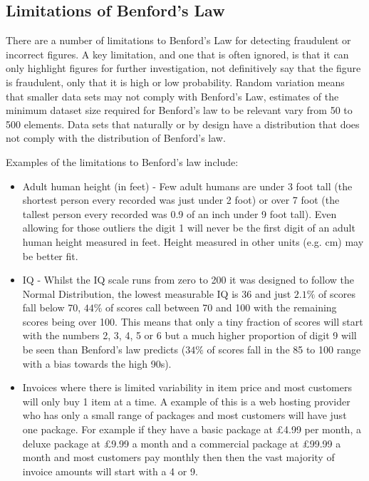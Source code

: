 \subsection{Limitations of Benford's Law}
There are a number of limitations to Benford's Law for detecting fraudulent or incorrect figures.  A key limitation, and one that is often ignored, is that it can only highlight figures for further investigation, not definitively say that the figure is fraudulent, only that it is high or low probability.  Random variation means that smaller data sets may not comply with Benford's Law, estimates of the minimum dataset size required for Benford's law to be relevant vary from 50 to 500 elements. Data sets that naturally or by design have a distribution that does not comply with the distribution of Benford's law.  

Examples of the limitations to Benford's law include:
\begin{itemize}
\item Adult human height (in feet) - Few adult humans are under 3 foot tall (the shortest person every recorded was just under 2 foot) or over 7 foot (the tallest person every recorded was 0.9 of an inch under 9 foot tall).  Even allowing for those outliers the digit 1 will never be the first digit of an adult human height measured in feet.  Height measured in other units (e.g. cm) may be  better fit.
\item IQ - Whilst the IQ scale runs from zero to 200 it was designed to follow the Normal Distribution,  the lowest measurable IQ is 36 and just $2.1\% $ of scores fall below 70, $44\%$ of scores call between 70 and 100 with the remaining scores being over 100.  This means that only a tiny fraction of scores will start with the numbers 2, 3, 4, 5 or 6 but a much higher proportion  of digit 9 will be seen than Benford's law predicts ($34\%$ of scores fall in the 85 to 100 range with a bias towards the high 90s).
\item Invoices where there is limited variability in item price and most customers will only buy 1 item at a time.  A example of this is a web hosting provider who has only a small range of packages and most customers will have just one package.  For example if they have a basic package at £4.99 per month, a deluxe package at £9.99 a month and a commercial package at £99.99 a month and most customers pay monthly then then the vast majority of invoice amounts will start with a 4 or 9.
\end{itemize}


